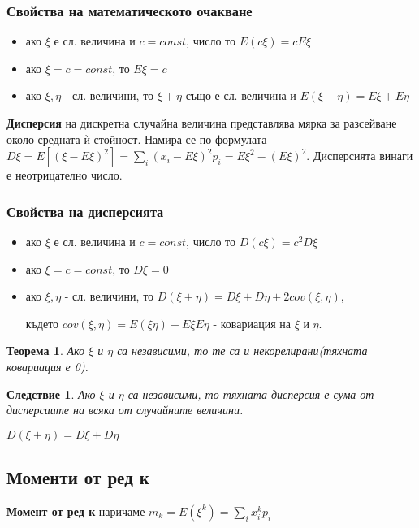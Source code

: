 \documentclass[fleqn,12pt]{article}
\newtheorem*{Th}{Теорема}
\newtheorem*{Corollary}{Следствие}
\begin{document}
\begin{justify}
\subsubsection{Свойства на математическото очакване}
\begin{itemize}
    \item ако $\xi$ е сл. величина  и $c=const$, число то $E(c\xi) = cE\xi$
    \item ако $\xi = c = const$, то $E\xi = c$
    \item ако $\xi, \eta$ - сл. величини, то $\xi + \eta$ също е сл. величина и $E\left( \xi + \eta \right) = E\xi +
    E\eta$
\end{itemize}

\textbf{Дисперсия} на дискретна случайна величина представлява мярка за разсейване около средната ѝ стойност. Намира се
по формулата $D\xi = E[\left(\xi - E\xi\right)^2] = \sum_i (x_i - E\xi)^2 p_i = E\xi^2 - (E\xi)^2$. Дисперсията винаги е
неотрицателно число.

\subsubsection{Свойства на дисперсията}
\begin{itemize}
    \item ако $\xi$ е сл. величина  и $c=const$, число то $D\left( c\xi \right) = c^2 D\xi$
    \item ако $\xi = c = const$, то $D\xi = 0$
    \item ако $\xi, \eta$ - сл. величини, то  $D(\xi + \eta) = D\xi + D\eta + 2cov(\xi, \eta)$, 

    където $cov(\xi, \eta) = E\left( \xi \eta \right) - E\xi E\eta$ - ковариация на $\xi$ и $\eta$.
\end{itemize}

\begin{Th}
    Ако $\xi$ и $\eta$ са независими, то те са и некорелирани(тяхната ковариация е 0).
\end{Th}
\begin{Corollary}
    Ако $\xi$ и $\eta$ са независими, то тяхната дисперсия е сума от дисперсиите на всяка от случайните величини.

    $D(\xi + \eta) = D\xi + D\eta$
\end{Corollary}

\subsection{Моменти от ред к}
\textbf{Момент от ред к} наричаме $m_k = E(\xi^k) = \sum_i x_i^kp_i$


\end{justify}
\end{document}
